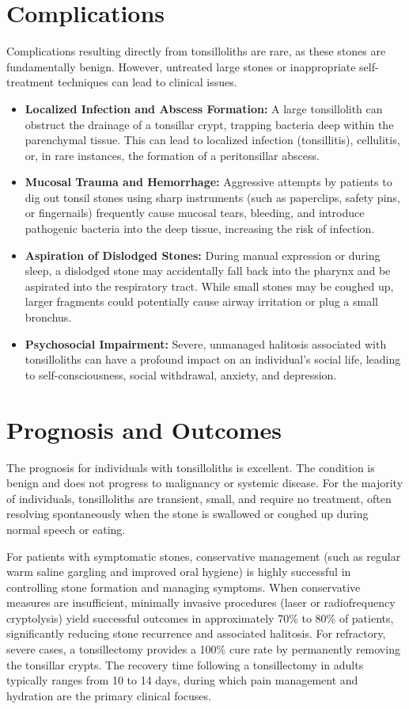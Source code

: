 \section*{Complications}
Complications resulting directly from tonsilloliths are rare, as these stones are fundamentally benign. However, untreated large stones or inappropriate self-treatment techniques can lead to clinical issues.
\begin{itemize}
    \item \textbf{Localized Infection and Abscess Formation:} A large tonsillolith can obstruct the drainage of a tonsillar crypt, trapping bacteria deep within the parenchymal tissue. This can lead to localized infection (tonsillitis), cellulitis, or, in rare instances, the formation of a peritonsillar abscess.
    \item \textbf{Mucosal Trauma and Hemorrhage:} Aggressive attempts by patients to dig out tonsil stones using sharp instruments (such as paperclips, safety pins, or fingernails) frequently cause mucosal tears, bleeding, and introduce pathogenic bacteria into the deep tissue, increasing the risk of infection.
    \item \textbf{Aspiration of Dislodged Stones:} During manual expression or during sleep, a dislodged stone may accidentally fall back into the pharynx and be aspirated into the respiratory tract. While small stones may be coughed up, larger fragments could potentially cause airway irritation or plug a small bronchus.
    \item \textbf{Psychosocial Impairment:} Severe, unmanaged halitosis associated with tonsilloliths can have a profound impact on an individual's social life, leading to self-consciousness, social withdrawal, anxiety, and depression.
\end{itemize}

\section*{Prognosis and Outcomes}
The prognosis for individuals with tonsilloliths is excellent. The condition is benign and does not progress to malignancy or systemic disease. For the majority of individuals, tonsilloliths are transient, small, and require no treatment, often resolving spontaneously when the stone is swallowed or coughed up during normal speech or eating.

For patients with symptomatic stones, conservative management (such as regular warm saline gargling and improved oral hygiene) is highly successful in controlling stone formation and managing symptoms. When conservative measures are insufficient, minimally invasive procedures (laser or radiofrequency cryptolysis) yield successful outcomes in approximately 70\% to 80\% of patients, significantly reducing stone recurrence and associated halitosis. For refractory, severe cases, a tonsillectomy provides a 100\% cure rate by permanently removing the tonsillar crypts. The recovery time following a tonsillectomy in adults typically ranges from 10 to 14 days, during which pain management and hydration are the primary clinical focuses.

